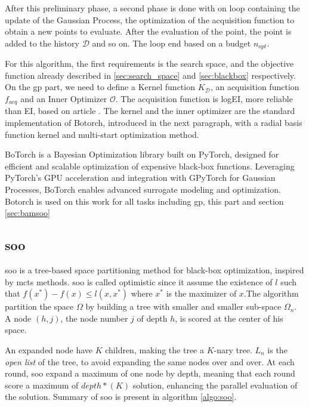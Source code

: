 After this preliminary phase, a second phase is done with on loop containing the update of the Gaussian Process, the optimization of the acquisition function to obtain a new points to evaluate. After the evaluation of the point, the point is added to the history $\mathcal D$ and so on. The loop end based on a budget $n_{opt}$. 

For this algorithm, the first requirements is the search space, and the objective function already described in \ref{sec:search_space} and \ref{sec:blackbox} respectively. On the \acrshort{gp} part, we need to define a Kernel function $K_\mathcal D$, an acquisition function $f_{acq}$ and an Inner Optimizer $\mathcal O$. The acquisition function is logEI, more reliable than EI, based on article \cite{ament_unexpected_2024}. The kernel and the inner optimizer are the standard implementation of Botorch, introduced in the next paragraph, with a radial basis function kernel and multi-start optimization method. 

BoTorch \cite{balandat_botorch_2020} is a Bayesian Optimization library built on PyTorch, designed for efficient and scalable optimization of expensive black-box functions. Leveraging PyTorch's GPU acceleration and integration with GPyTorch \cite{gardner_gpytorch_2021} for Gaussian Processes, BoTorch enables advanced surrogate modeling and optimization. Botorch is used on this work for all tasks including \acrshort{gp}, this part and section \ref{sec:bamsoo}


\subsection{\acrfull{soo}}
\label{sec:soo}

\acrshort{soo} \cite{munos_optimistic_2011} is a tree-based space partitioning method for black-box optimization, inspired by \acrfull{mcts} methods. \acrshort{soo} is called optimistic since it assume the existence of $ l$ such that $f(x^*)-f(x) \leq l(x,x^*)$ where $x^*$ is the maximizer of $x$.The algorithm partition the space $\Omega$ by building a tree with smaller and smaller sub-space $\Omega_n$. A node $(h,j)$, the node number $j$ of depth $h$, is scored at the center of his space. 

    
An expanded node have $K$ children, making the tree a $K$-nary tree. $L_n$ is the \textit{open list} of the tree, to avoid expanding the same nodes over and over. At each round, \acrshort{soo} expand a maximum of one node by depth, meaning that each round score a maximum of $depth*(K)$ solution, enhancing the parallel evaluation of the solution. Summary of \acrshort{soo} is present in algorithm \ref{algo:soo}.

